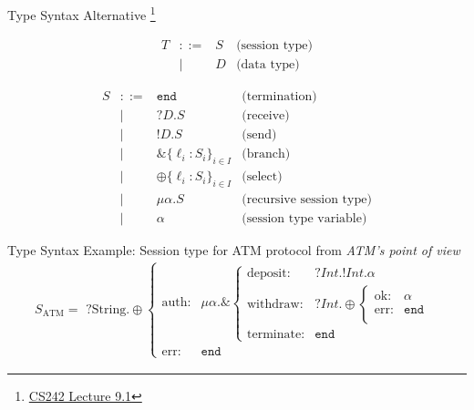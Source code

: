 \begin{frame}{Type Syntax}
  Alternative \footnote{\href{https://stanford-cs242.github.io/f19/lectures/09-1-session-types}{CS242 Lecture 9.1}}
  \begin{center}
    \begin{minipage}{0.48\textwidth}
      $$\begin{array}{lclr}
          T & ::= & S & \text{(session type)} \\
            & |   & D & \text{(data type)}
        \end{array}$$
    \end{minipage}
    \hfill
    \begin{minipage}{0.48\textwidth}
      $$\begin{array}{lclr}
          S & ::= & \texttt{end}                  & \text{(termination)}            \\
            & |   & ?D.S                          & \text{(receive)}                \\
            & |   & !D.S                          & \text{(send)}                   \\
            & |   & \&\{\ell_i:S_i\}_{i\in I}     & \text{(branch)}                 \\
            & |   & \oplus\{\ell_i:S_i\}_{i\in I} & \text{(select)}                 \\
            & |   & \mu\alpha.S                   & \text{(recursive session type)} \\
            & |   & \alpha                        & \text{(session type variable)}
        \end{array}$$
    \end{minipage}
  \end{center}
\end{frame}

\begin{frame}{Type Syntax}
  Example: Session type for ATM protocol from \textit{ATM's point of view}
  \begin{align*}
    S_\text{ATM} = \,\,?\text{String}.\oplus
    \begin{cases}
      \text{auth:} & \mu\alpha.\&
      \begin{cases}
        \text{deposit:}   & ?Int.!Int.\alpha \\
        \text{withdraw:}  & ?Int.\oplus
        \begin{cases}
          \text{ok:}  & \alpha       \\
          \text{err:} & \texttt{end} \\
        \end{cases}           \\
        \text{terminate:} & \texttt{end}
      \end{cases} \\
      \text{err:}  & \texttt{end}
    \end{cases}
  \end{align*}

\end{frame}

